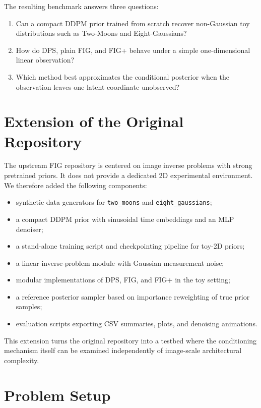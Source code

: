 \documentclass[10pt,twocolumn]{article}
\begin{document}
The resulting benchmark answers three questions:
\begin{enumerate}[leftmargin=1.5em]
    \item Can a compact DDPM prior trained from scratch recover non-Gaussian toy distributions such as Two-Moons and Eight-Gaussians?
    \item How do DPS, plain FIG, and FIG+ behave under a simple one-dimensional linear observation?
    \item Which method best approximates the conditional posterior when the observation leaves one latent coordinate unobserved?
\end{enumerate}

\section{Extension of the Original Repository}

The upstream FIG repository is centered on image inverse problems with strong pretrained priors. It does not provide a dedicated 2D experimental environment. We therefore added the following components:
\begin{itemize}[leftmargin=1.5em]
    \item synthetic data generators for \texttt{two\_moons} and \texttt{eight\_gaussians};
    \item a compact DDPM prior with sinusoidal time embeddings and an MLP denoiser;
    \item a stand-alone training script and checkpointing pipeline for toy-2D priors;
    \item a linear inverse-problem module with Gaussian measurement noise;
    \item modular implementations of DPS, FIG, and FIG+ in the toy setting;
    \item a reference posterior sampler based on importance reweighting of true prior samples;
    \item evaluation scripts exporting CSV summaries, plots, and denoising animations.
\end{itemize}

This extension turns the original repository into a testbed where the conditioning mechanism itself can be examined independently of image-scale architectural complexity.

\section{Problem Setup}
\end{document}
